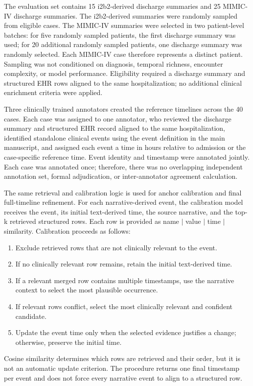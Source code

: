 \noindent
The evaluation set contains 15 i2b2-derived discharge summaries and 25 MIMIC-IV discharge summaries. The i2b2-derived summaries were randomly sampled from eligible cases. The MIMIC-IV summaries were selected in two patient-level batches: for five randomly sampled patients, the first discharge summary was used; for 20 additional randomly sampled patients, one discharge summary was randomly selected. Each MIMIC-IV case therefore represents a distinct patient. Sampling was not conditioned on diagnosis, temporal richness, encounter complexity, or model performance. Eligibility required a discharge summary and structured EHR rows aligned to the same hospitalization; no additional clinical enrichment criteria were applied.

Three clinically trained annotators created the reference timelines across the 40 cases. Each case was assigned to one annotator, who reviewed the discharge summary and structured EHR record aligned to the same hospitalization, identified standalone clinical events using the event definition in the main manuscript, and assigned each event a time in hours relative to admission or the case-specific reference time. Event identity and timestamp were annotated jointly. Each case was annotated once; therefore, there was no overlapping independent annotation set, formal adjudication, or inter-annotator agreement calculation.

\noindent The same retrieval and calibration logic is used for anchor calibration and final full-timeline refinement. For each narrative-derived event, the calibration model receives the event, its initial text-derived time, the source narrative, and the top-k retrieved structured rows. Each row is provided as name $\mid$ value $\mid$ time $\mid$ similarity. Calibration proceeds as follows:
\begin{enumerate}
    \item Exclude retrieved rows that are not clinically relevant to the event.
    \item If no clinically relevant row remains, retain the initial text-derived time.
    \item If a relevant merged row contains multiple timestamps, use the narrative context to select the most plausible occurrence.
    \item If relevant rows conflict, select the most clinically relevant and confident candidate.
    \item Update the event time only when the selected evidence justifies a change; otherwise, preserve the initial time.
\end{enumerate}
Cosine similarity determines which rows are retrieved and their order, but it is not an automatic update criterion. The procedure returns one final timestamp per event and does not force every narrative event to align to a structured row.

